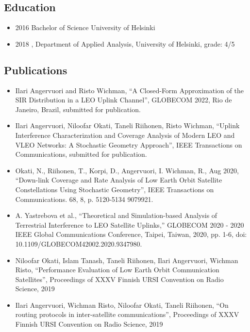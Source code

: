 \documentclass{article}
\begin{document}
        \subsection{Education}
        \begin{itemize}
        \item 2016 Bachelor of Science University of Helsinki\\
        \item 2018 , Department of Applied Analysis, University of Helsinki, grade: 4/5
          
        \end{itemize}

        
        
        \subsection{Publications}
        

        \begin{itemize}
        \item
          Ilari Angervuori and  Risto Wichman, ``A Closed-Form Approximation of the SIR
          Distribution in a LEO Uplink Channel'', GLOBECOM 2022, Rio de Janeiro, Brazil, submitted for publication.
        \item
          Ilari Angervuori,  Niloofar Okati, Taneli Riihonen,  Risto Wichman, ``Uplink Interference Characterization and Coverage Analysis of Modern {LEO} and {VLEO} Networks: A Stochastic Geometry Approach'', IEEE Transactions on Communications, submitted for publication.
        \item 
          Okati, N., Riihonen, T., Korpi, D., Angervuori, I. Wichman, R., Aug 2020, ``Down-link Coverage and Rate Analysis of Low Earth Orbit Satellite Constellations Using Stochastic Geometry'',  IEEE Transactions on Communications. 68, 8, p. 5120-5134 9079921.\\
        \item A. Yastrebova et al., ``Theoretical and Simulation-based Analysis of Terrestrial Interference to LEO Satellite Uplinks,'' GLOBECOM 2020 - 2020 IEEE Global Communications Conference, Taipei, Taiwan, 2020, pp. 1-6, doi: 10.1109/GLOBECOM42002.2020.9347980.
        \item Niloofar Okati, Islam Tanash, Taneli Riihonen, Ilari Angervuori, Wichman Risto, ``Performance Evaluation of Low Earth Orbit Communication Satellites'', Proceedings of XXXV Finnish URSI Convention on Radio Science, 2019
        \item Ilari Angervuori, Wichman Risto, Niloofar Okati, Taneli Riihonen, ``On routing protocols in inter-satellite communications'', Proceedings of XXXV Finnish URSI Convention on Radio Science, 2019
          
        \end{itemize}
\end{document}
